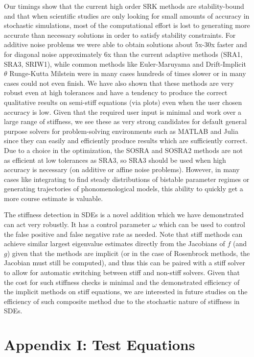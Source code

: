 \documentclass{article}
\begin{document}
Our timings show that the current high order SRK methods are stability-bound
and that when scientific studies are only looking for small amounts
of accuracy in stochastic simulations, most of the computational effort
is lost to generating more accurate than necessary solutions in order
to satisfy stability constraints. For additive noise problems we were
able to obtain solutions about 5x-30x faster and for diagonal noise
approximately 6x than the current adaptive methods (SRA1, SRA3, SRIW1),
while common methods like Euler-Maruyama and Drift-Implicit $\theta$
Runge-Kutta Milstein were in many cases hundreds of times slower or
in many cases could not even finish. We have also shown that these
methods are very robust even at high tolerances and have a tendency
to produce the correct qualitative results on semi-stiff equations
(via plots) even when the user chosen accuracy is low. Given that
the required user input is minimal and work over a large range of
stiffness, we see these as very strong candidates for default general
purpose solvers for problem-solving environments such as MATLAB and
Julia since they can easily and efficiently produce results which
are sufficiently correct. Due to a choice in the optimization, the
SOSRA and SOSRA2 methods are not as efficient at low tolerances as
SRA3, so SRA3 should be used when high accuracy is necessary (on additive
or affine noise problems). However, in many cases like integrating
to find steady distributions of bistable parameter regimes or generating
trajectories of phonomenological models, this ability to quickly get
a more course estimate is valuable.

The stiffness detection in SDEs is a novel addition which we have
demonstrated can act very robustly. It has a control parameter $\omega$
which can be used to control the false positive and false negative
rate as needed. Note that stiff methods can achieve similar largest
eigenvalue estimates directly from the Jacobians of $f$ (and $g$)
given that the methods are implicit (or in the case of Rosenbrock
methods, the Jacobian must still be computed), and thus this can be
paired with a stiff solver to allow for automatic switching between
stiff and non-stiff solvers. Given that the cost for such stiffness
checks is minimal and the demonstrated efficiency of the implicit
methods on stiff equations, we are interested in future studies on
the efficiency of such composite method due to the stochastic nature
of stiffness in SDEs.

\appendix
\section{Appendix I: Test Equations}
\end{document}
